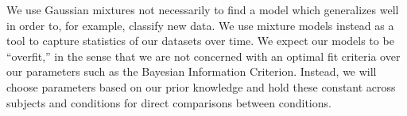 \documentclass[../main.tex]{subfiles}
\begin{document}

We use Gaussian mixtures not necessarily to find a model which generalizes well in order to, for example, classify new data. We use mixture models instead as a tool to capture statistics of our datasets over time. We expect our models to be ``overfit,'' in the sense that we are not concerned with an optimal fit criteria over our parameters such as the Bayesian Information Criterion. Instead, we will choose parameters based on our prior knowledge and hold these constant across subjects and conditions for direct comparisons between conditions.
\end{document}
